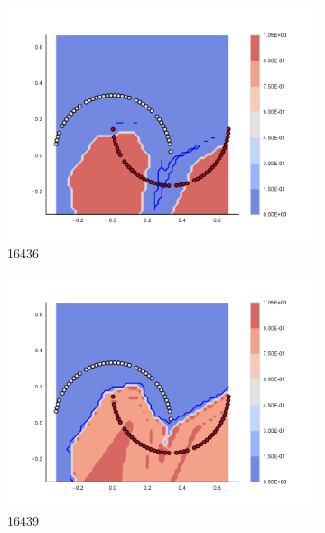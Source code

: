         \begin{figure}[h]\ContinuedFloat
        
\begin{subfigure}[b]{0.09\textwidth}
    \includegraphics[clip, trim=2.35cm 1.75cm 4.5cm 0cm,width=\textwidth]{img/convergence/16436.pdf}
    \caption{16436}
    \label{fig:convergence_16436}
\end{subfigure}
%
\begin{subfigure}[b]{0.09\textwidth}
    \includegraphics[clip, trim=2.35cm 1.75cm 4.5cm 0cm,width=\textwidth]{img/convergence/16439.pdf}
    \caption{16439}
    \label{fig:convergence_16439}
\end{subfigure}
%
\begin{subfigure}[b]{0.09\textwidth}

\end{subfigure}
\end{figure}
